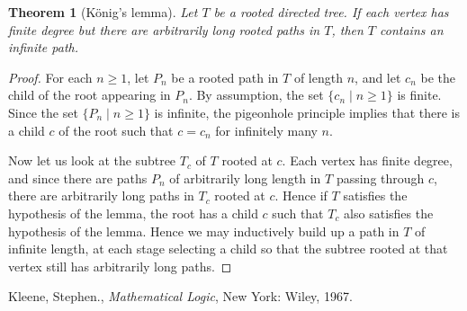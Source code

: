 \documentclass{article}
\newtheorem*{theorem*}{Theorem}
\begin{document}
\begin{theorem*}[K\"onig's lemma]
Let $T$ be a rooted directed tree.  If each vertex has finite 
degree but there are arbitrarily long rooted paths in $T$, 
then $T$ contains an infinite path.
\end{theorem*}

\begin{proof}
For each $n\ge 1$, let $P_n$ be a rooted path in $T$ of length $n$,
and let $c_n$ be the child of the root appearing in $P_n$.
By assumption, the set $\{c_n\mid n\ge 1\}$ is finite.  
Since the set $\{P_n\mid n\ge 1\}$ is infinite, the 
pigeonhole principle implies that there is a child $c$ of the root
such that $c=c_n$ for infinitely many $n$.  

Now let us look at the subtree $T_c$ of $T$ rooted at $c$.  Each vertex
has finite degree, and since there are paths $P_n$ of arbitrarily 
long length in $T$ passing through $c$, there are arbitrarily long
paths in $T_c$ rooted at $c$.  Hence if $T$ satisfies the hypothesis
of the lemma, the root has a child $c$ such that $T_c$ also satisfies
the hypothesis of the lemma.  Hence we may inductively build up a
path in $T$ of infinite length, at each stage selecting a child so
that the subtree rooted at that vertex still has arbitrarily long
paths.
\end{proof}



\begin{thebibliography}{9}
Kleene, Stephen., \emph{Mathematical Logic}, New York: Wiley, 1967.
\end{thebibliography}
\end{document}

